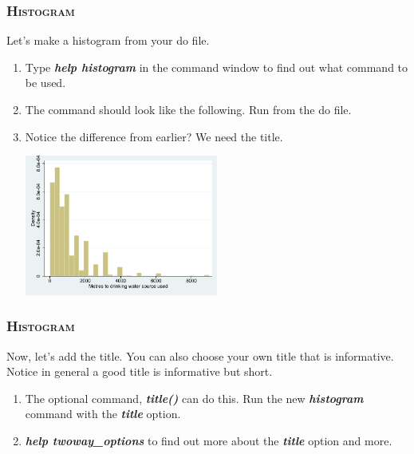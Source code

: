 \documentclass[10pt]{beamer}
\begin{document}
	\begin{frame}
	\frametitle{\textsc{Histogram}}	
		 Let's make a histogram from your do file.
		\begin{enumerate}
			 \item Type \textbf{\textit{help histogram}} in the command window to find out what command to be used.
			 \onslide<2-> \item The command should look like the following. Run from the do file.
		
\begin{stlog}\end{stlog}
			\vspace{2mm}
			 \item Notice the difference from earlier? We need the title.
			\vspace{2mm}
		
\begin{center}
    \includegraphics[width=0.5\textwidth]{hist_2.pdf}
\end{center}
		\end{enumerate}
	\end{frame}

	\begin{frame}
	\frametitle{\textsc{Histogram}}	
		 Now, let's add the title. You can also choose your own title that is informative.
					 Notice in general a good title is informative but short.
		\begin{enumerate}
			  \item The optional command, \textbf{\textit{title()}} can do this.
								Run the new \textbf{\textit{histogram}} command with 
								the \textbf{\textit{title}} option.
		
\begin{stlog}\end{stlog}
			\vspace{1mm}
			 \item \textbf{\textit{help twoway\_options}} to find out more about the \textbf{\textit{title}} option and more.
		\end{enumerate}
	\end{frame}
		
\end{document}

